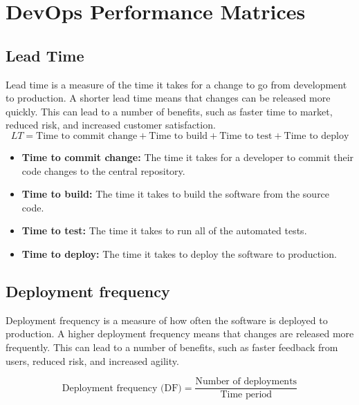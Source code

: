 \documentclass[12pt, letterpaper]{article}
\begin{document}
\section{DevOps Performance Matrices}

\subsection{Lead Time}

Lead time is a measure of the time it takes for a change to go from development to production. A shorter lead time means that changes can be released more quickly. This can lead to a number of benefits, such as faster time to market, reduced risk, and increased customer satisfaction\cite{Mishra2020DevOpsAS}.
\begin{equation}
    LT = \text{Time to commit change} + \text{Time to build} + \text{Time to test} + \text{Time to deploy}
\end{equation}




\begin{itemize}
    \item \textbf{Time to commit change:} The time it takes for a developer to commit their code changes to the central repository.
    \item \textbf{Time to build:} The time it takes to build the software from the source code.
    \item \textbf{Time to test:} The time it takes to run all of the automated tests.
    \item \textbf{Time to deploy:} The time it takes to deploy the software to production.
\end{itemize}


\subsection{Deployment frequency }

Deployment frequency is a measure of how often the software is deployed to production. A higher deployment frequency means that changes are released more frequently. This can lead to a number of benefits, such as faster feedback from users, reduced risk, and increased agility\cite{Jabbari}.


\begin{equation}
\text{Deployment frequency (DF)} = \frac{\text{Number of deployments}}{\text{Time period}}
\end{equation}
\end{document}
